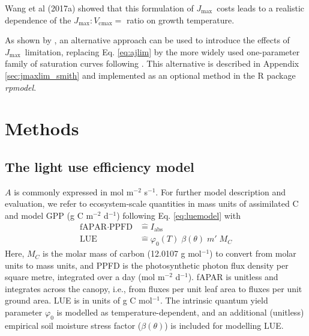\documentclass[gmd, manuscript]{copernicus}
\newcommand{\vcmax}{$V_{\text{cmax}}$}
\newcommand{\jmax}{$J_{\text{max}}$}
\begin{document}
Wang et al (2017a) showed that this formulation of \jmax\ costs leads to a realistic dependence of the \jmax $:$\vcmax $=$ ratio on growth temperature.

As shown by \citet{smith19ecollett}, an alternative approach can be used to introduce the effects of \jmax\ limitation, replacing Eq. \ref{eq:ajlim} by the more widely used one-parameter family of saturation curves following \citet{farquhar84}. This alternative is described in Appendix \ref{sec:jmaxlim_smith} and implemented as an optional method in the R package \textit{rpmodel}.


\section{Methods}
\label{sec:methods}

\subsection{The light use efficiency model}
\label{sec:luemodel}
$A$ is commonly expressed in mol m$^{-2}$ s$^{-1}$. For further model description and evaluation, we refer to ecosystem-scale quantities in mass units of assimilated C and model GPP (g C m$^{-2}$ d$^{-1}$) following Eq. \ref{eq:luemodel}
with 
\begin{align}
    \label{eq:iabs_identification}
    \text{fAPAR} \cdot \text{PPFD} &\mathrel{\widehat{=}} I_{\text{abs}} \\
    \label{eq:lue_identification}
    \text{LUE} &\mathrel{\widehat{=}} \varphi_0(T) \; \beta(\theta) \; m' \; M_C
\end{align}
Here, $M_C$ is the molar mass of carbon (12.0107 g mol$^{-1}$) to convert from molar units to mass units, and PPFD is the photosynthetic photon flux density per square metre, integrated over a day (mol m$^{-2}$ d$^{-1}$). fAPAR is unitless and integrates across the canopy, i.e., from fluxes per unit leaf area to fluxes per unit ground area. LUE is in units of g C mol$^{-1}$. The intrinsic quantum yield parameter $\varphi_0$ is modelled as temperature-dependent, and an additional (unitless) empirical soil moisture stress factor ($\beta (\theta)$) is included for modelling LUE.
\end{document}
